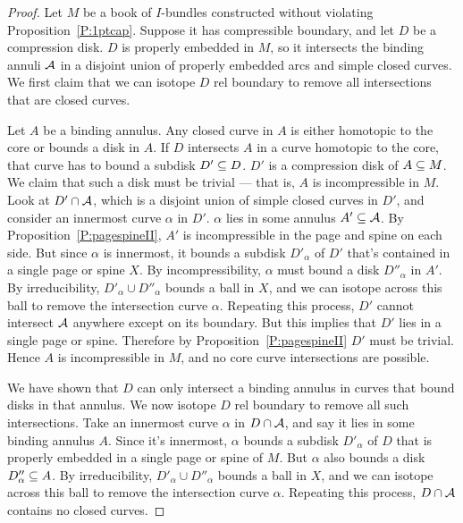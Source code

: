 \begin{proof}

Let $M$ be a book of $I$-bundles constructed without violating
Proposition~\ref{P:1ptcap}. Suppose it has compressible boundary, and let $D$
be a compression disk. $D$ is properly embedded in $M$, so it intersects the
binding annuli $\mathcal{A}$ in a disjoint union of properly embedded arcs and simple
closed curves.  We first claim that we can isotope $D$ rel boundary to remove
all intersections that are closed curves.

Let $A$ be a binding annulus. Any closed curve in $A$ is either homotopic to
the core or bounds a disk in $A$. If $D$ intersects $A$ in a curve homotopic to
the core, that curve has to bound a subdisk $D' \subseteq D$. $D'$ is a compression
disk of $A \subseteq M$. We claim that such a disk must be trivial --- that is, $A$
is incompressible in $M$.  Look at $D' \cap \mathcal{A}$, which is a disjoint union of
simple closed curves in $D'$, and consider an innermost curve $\alpha$ in $D'$.
$\alpha$ lies in some annulus $A' \subseteq \mathcal{A}$.  By
Proposition~\ref{P:pagespineII}, $A'$ is incompressible in the page and spine
on each side. But since $\alpha$ is innermost, it bounds a subdisk $D'_\alpha$
of $D'$ that's contained in a single page or spine $X$. By incompressibility,
$\alpha$ must bound a disk $D''_\alpha$ in $A'$. By irreducibility, $D'_\alpha
\cup D''_\alpha$ bounds a ball in $X$, and we can isotope across this ball to
remove the intersection curve $\alpha$. Repeating this process, $D'$ cannot
intersect $\mathcal{A}$ anywhere except on its boundary. But this implies that $D'$
lies in a single page or spine.  Therefore by Proposition~\ref{P:pagespineII}
$D'$ must be trivial.  Hence $A$ is incompressible in $M$, and no core curve
intersections are possible.

We have shown that $D$ can only intersect a binding annulus in curves that
bound disks in that annulus.  We now isotope $D$ rel boundary to remove all
such intersections.  Take an innermost curve $\alpha$ in $D \cap \mathcal{A}$, and say
it lies in some binding annulus $A$. Since it's innermost, $\alpha$ bounds
a subdisk $D'_\alpha$ of $D$ that is properly embedded in a single page or
spine of $M$. But $\alpha$ also bounds a disk $D''_\alpha \subseteq A$. By
irreducibility, $D'_\alpha \cup D''_\alpha$ bounds a ball in $X$, and we can
isotope across this ball to remove the intersection curve $\alpha$. Repeating
this process, $D \cap \mathcal{A}$ contains no closed curves.


\end{proof}
